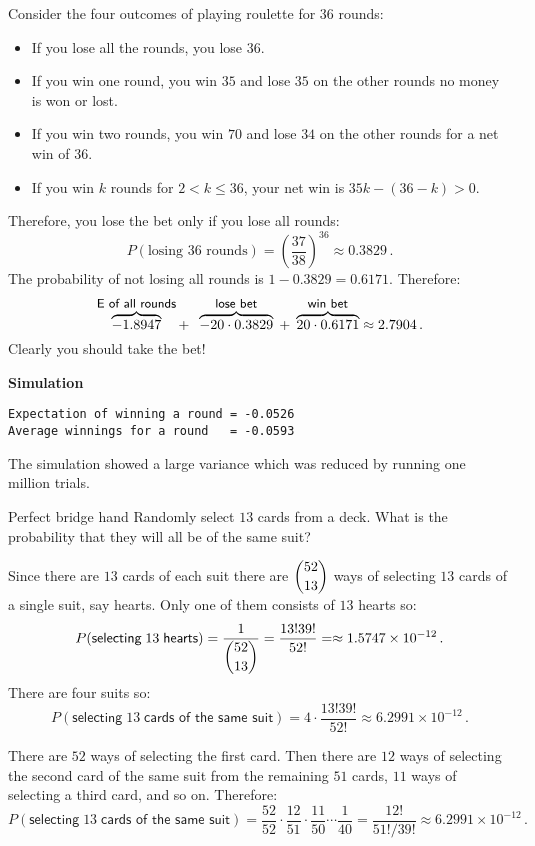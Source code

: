 Consider the four outcomes of playing roulette for $36$ rounds:
\begin{itemize}
\item If you lose all the rounds, you lose $36$.
\item If you win one round, you win $35$ and lose $35$ on the other rounds no money is won or lost.
\item If you win two rounds, you win $70$ and lose $34$ on the other rounds for a net win of $36$.
\item If you win $k$ rounds for $2<k\leq 36$, your net win is $35k - (36-k)>0$.
\end{itemize}
Therefore, you lose the bet only if you lose all rounds:
\[
P(\textrm{losing\ } 36 \textrm{\ rounds})=\left(\frac{37}{38}\right)^{36}\approx 0.3829\,.
\]
The probability of not losing all rounds is $1-0.3829=0.6171$. Therefore:
\[
\overbrace{-1.8947}^{\textsf{\small E of all rounds}}+\;\;
\overbrace{-20\cdot 0.3829}^{\textsf{\small lose bet}} \;+\; \overbrace{20\cdot 0.6171}^{\textsf{\small win bet}} \approx 2.7904\,.
\]
Clearly you should take the bet!

\textbf{Simulation}
\begin{verbatim}
Expectation of winning a round = -0.0526
Average winnings for a round   = -0.0593
\end{verbatim}
The simulation showed a large variance which was reduced by running one million trials.


\begin{prob}{Perfect bridge hand}
Randomly select $13$ cards from a deck. What is the probability that they will all be of the same suit?
\end{prob}


Since there are $13$ cards of each suit there are $\displaystyle{52 \choose 13}$ ways of selecting $13$ cards of a single suit, say hearts. Only one of them consists of $13$ hearts so:
\[
P(\textsf{selecting}\;13\;\textsf{hearts})=\frac{1}{\displaystyle{52 \choose 13}}=\frac{13! 39!}{52!}=\approx 1.5747\times 10^{-12}\,.
\]
There are four suits so:
\[
P(\textsf{selecting}\;13\;\textsf{cards of the same suit})=4\cdot \frac{13! 39!}{52!}\approx 6.2991\times 10^{-12}\,.
\]


There are $52$ ways of selecting the first card. Then there are $12$ ways of selecting the second card of the same suit from the remaining $51$ cards, $11$ ways of selecting a third card, and so on. Therefore:
\[
P(\textsf{selecting}\;13\;\textsf{cards of the same suit})=\frac{52}{52}\cdot \frac{12}{51}\cdot \frac{11}{50} \cdots  \frac{1}{40}= \frac{12!}{51!/39!}\approx 6.2991\times 10^{-12}\,.
\]

